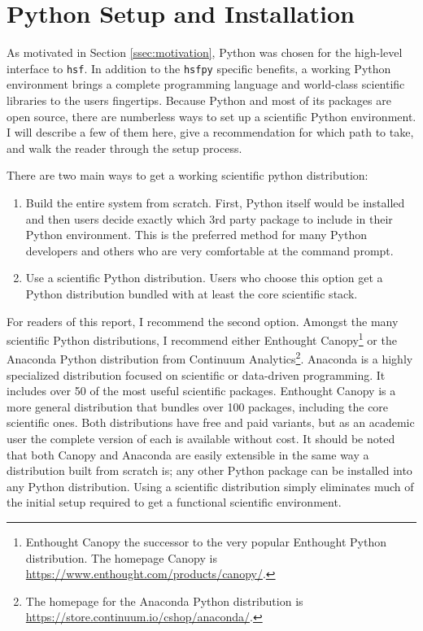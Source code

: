 \section{Python Setup and Installation} \label{app:install}

  As motivated in Section \ref{ssec:motivation}, Python was chosen for the high-level interface to \texttt{hsf}. In addition to the \texttt{hsfpy} specific benefits, a working Python environment brings a complete programming language and world-class scientific libraries to the users fingertips. Because Python and most of its packages are open source, there are numberless ways to set up a scientific Python environment. I will describe a few of them here, give a recommendation for which path to take, and walk the reader through the setup process.

  There are two main ways to get a working scientific python distribution:

  \begin{enumerate}[1)]
    \item Build the entire system from scratch. First, Python itself would be installed and then users decide exactly which 3rd party package to include in their Python environment. This is the preferred method for many Python developers and others who are very comfortable at the command prompt.
    \item Use a scientific Python distribution. Users who choose this option get a Python distribution bundled with at least the core scientific stack.
  \end{enumerate}

  For readers of this report, I recommend the second option. Amongst the many scientific Python distributions, I recommend either Enthought Canopy\footnote{Enthought Canopy the successor to the very popular Enthought Python distribution. The homepage Canopy is \url{https://www.enthought.com/products/canopy/}.} or the Anaconda Python distribution from Continuum Analytics\footnote{The homepage for the Anaconda Python distribution is \url{https://store.continuum.io/cshop/anaconda/}.}. Anaconda is a highly specialized distribution focused on scientific or data-driven programming. It includes over 50 of the most useful scientific packages. Enthought Canopy is a more general distribution that bundles over 100 packages, including the core scientific ones. Both distributions have free and paid variants, but as an academic user the complete version of each is available without cost. It should be noted that both Canopy and Anaconda are easily extensible in the same way a distribution built from scratch is; any other Python package can be installed into any Python distribution. Using a scientific distribution simply eliminates much of the initial setup required to get a functional scientific environment.

